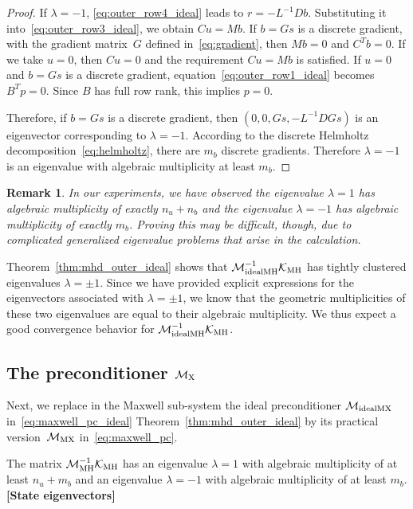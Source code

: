 \documentclass{siamltex}
\newtheorem{remark}[theorem]{Remark}
\begin{document}
\begin{proof}
If $\lambda = -1$, \eqref{eq:outer_row4_ideal} leads to $r = -L^{-1} D b.$
Substituting it into~\eqref{eq:outer_row3_ideal}, we obtain $Cu = Mb.$ If $b=Gs$ is a discrete gradient, with the gradient matrix~$G$ defined in~\eqref{eq:gradient}, then $Mb = 0$ and $C^T b = 0$. If we take $u=0$, then $Cu = 0$ and the requirement $Cu = Mb$ is satisfied.
If $u=0$ and $b=Gs$ is a discrete gradient, equation~\eqref{eq:outer_row1_ideal} becomes $B^Tp = 0$. Since $B$ has full row rank, this implies $p=0$.

Therefore, if $b=Gs$ is a discrete gradient, then $(0, 0, Gs, -L^{-1}D Gs)$ is an eigenvector corresponding to $\lambda = -1$. According to the discrete Helmholtz decomposition~\eqref{eq:helmholtz}, there are $m_b$ discrete gradients. Therefore $\lambda = -1$ is an eigenvalue with algebraic multiplicity at least  $m_b$.
\end{proof}

\begin{remark}
In our experiments, we have observed the eigenvalue $\lambda = 1$ has algebraic multiplicity of exactly $n_u+n_b$ and the eigenvalue $\lambda = -1$ has algebraic multiplicity of exactly $m_b$. Proving this may be difficult, though, due to complicated generalized eigenvalue problems that arise in the calculation.
\end{remark}

Theorem~\ref{thm:mhd_outer_ideal} shows that $\mathcal{M}_{\rm idealMH}^{-1} \mathcal{K}_{\rm MH}$ has tightly clustered eigenvalues $\lambda=\pm 1$.  Since we have provided explicit expressions for the eigenvectors associated with $\lambda= \pm 1$, we know that the geometric multiplicities of these two eigenvalues are equal to their algebraic multiplicity.
We thus expect a good convergence behavior for  $\mathcal{M}_{\rm idealMH}^{-1} \mathcal{K}_{\rm MH}$.

\subsection{The preconditioner ${\mathcal M}_{\rm X}$}

Next, we replace in the Maxwell sub-system the ideal preconditioner ${\mathcal M}_{\rm idealMX}$ in~\eqref{eq:maxwell_pc_ideal} Theorem~\ref{thm:mhd_outer_ideal} by its practical version~${\mathcal M}_{\rm MX}$ in~\eqref{eq:maxwell_pc}.

\begin{theorem}
\label{thm:mhd_outer}
The matrix $\mathcal{M}_{\rm MH}^{-1} \mathcal{K}_{\rm MH}$ has an eigenvalue $\lambda = 1$ with algebraic multiplicity of at least $n_u+m_b$ and an eigenvalue $\lambda = -1$ with  algebraic multiplicity of at least $m_b$. {\bf [State eigenvectors]}
\end{theorem}
\end{document}
